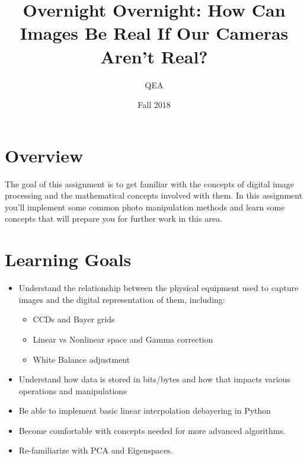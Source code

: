 \documentclass{tufte-handout}
\title{Overnight Overnight: How Can Images Be Real If Our Cameras Aren't Real?}
\author{QEA}
\date{Fall 2018}
\begin{document}
\maketitle
\thispagestyle{firstpage}


\section{Overview}

The goal of this assignment is to get familiar with the concepts of digital image processing and the mathematical concepts involved with them. In this assignment you'll implement some common photo manipulation methods and learn some concepts that will prepare you for further work in this area.

\section{Learning Goals}

\begin{itemize}
\item Understand the relationship between the physical equipment used to capture
images and the digital representation of them, including:
    \begin{itemize}
        \item CCDs and Bayer grids
        \item Linear vs Nonlinear space and Gamma correction
        \item White Balance adjustment
    \end{itemize}
\item Understand how data is stored in bits/bytes and how that impacts various
operations and manipulations
\item Be able to implement basic linear interpolation debayering in Python
\item Become comfortable with concepts needed for more advanced algorithms.
\item Re-familiarize with PCA and Eigenspaces.
\end{itemize}
\end{document}
